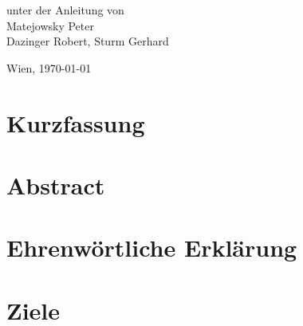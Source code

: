 \documentclass[
    headings=optiontotocandhead,%
    twoside,
    numbers=noenddot,%
    toc=flat, %
    12pt, %
    titlepage, %
    parskip=full, %
    listof=totoc, %
    listof=flat, %
    numbers=noenddot, %
    bibliography=totoc, %
    a4paper,DIV=14,
    BCOR=15mm,
]{scrbook}
\begin{document}
\begin{titlepage}
\begin{center}
\par\end{center}{\large \par}

\begin{center}
\vspace{20mm}
 \normalsize unter der Anleitung von\\
 \vspace{0.5cm}
Matejowsky Peter\\
Dazinger Robert,
Sturm Gerhard
\par\end{center}

\begin{center}
\vspace{5mm}
Wien, \today
\par\end{center}

\end{titlepage}%
\chapter*{Kurzfassung}


\chapter*{Abstract}


\chapter*{Ehrenwörtliche Erklärung}


\cleardoublepage{}
\tableofcontents{}
\cleardoublepage{}
\listoftables
{}
\cleardoublepage{}
\listoffigures


\cleardoublepage{}
\mainmatter

\chapter{Ziele}
\end{document}

